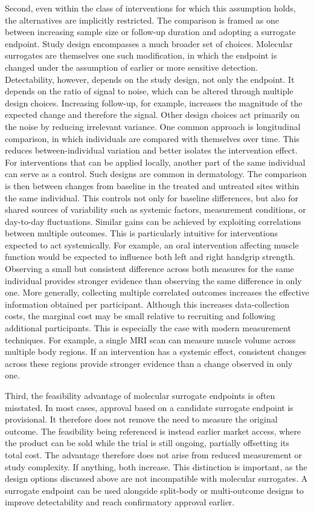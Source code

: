 \documentclass[twocolumn]{article} %
\begin{document}
Second, even within the class of interventions for which this assumption holds, the alternatives are implicitly restricted. The comparison is framed as one between increasing sample size or follow-up duration and adopting a surrogate endpoint. Study design encompasses a much broader set of choices. Molecular surrogates are themselves one such modification, in which the endpoint is changed under the assumption of earlier or more sensitive detection. Detectability, however, depends on the study design, not only the endpoint. It depends on the ratio of signal to noise, which can be altered through multiple design choices. Increasing follow-up, for example, increases the magnitude of the expected change and therefore the signal. Other design choices act primarily on the noise by reducing irrelevant variance. One common approach is longitudinal comparison, in which individuals are compared with themselves over time. This reduces between-individual variation and better isolates the intervention effect. For interventions that can be applied locally, another part of the same individual can serve as a control. Such designs are common in dermatology. The comparison is then between changes from baseline in the treated and untreated sites within the same individual. This controls not only for baseline differences, but also for shared sources of variability such as systemic factors, measurement conditions, or day-to-day fluctuations. Similar gains can be achieved by exploiting correlations between multiple outcomes. This is particularly intuitive for interventions expected to act systemically. For example, an oral intervention affecting muscle function would be expected to influence both left and right handgrip strength. Observing a small but consistent difference across both measures for the same individual provides stronger evidence than observing the same difference in only one. More generally, collecting multiple correlated outcomes increases the effective information obtained per participant. Although this increases data-collection costs, the marginal cost may be small relative to recruiting and following additional participants. This is especially the case with modern measurement techniques. For example, a single MRI scan can measure muscle volume across multiple body regions. If an intervention has a systemic effect, consistent changes across these regions provide stronger evidence than a change observed in only one.

Third, the feasibility advantage of molecular surrogate endpoints is often misstated. In most cases, approval based on a candidate surrogate endpoint is provisional. It therefore does not remove the need to measure the original outcome. The feasibility being referenced is instead earlier market access, where the product can be sold while the trial is still ongoing, partially offsetting its total cost. The advantage therefore does not arise from reduced measurement or study complexity. If anything, both increase. This distinction is important, as the design options discussed above are not incompatible with molecular surrogates. A surrogate endpoint can be used alongside split-body or multi-outcome designs to improve detectability and reach confirmatory approval earlier.
\end{document}
